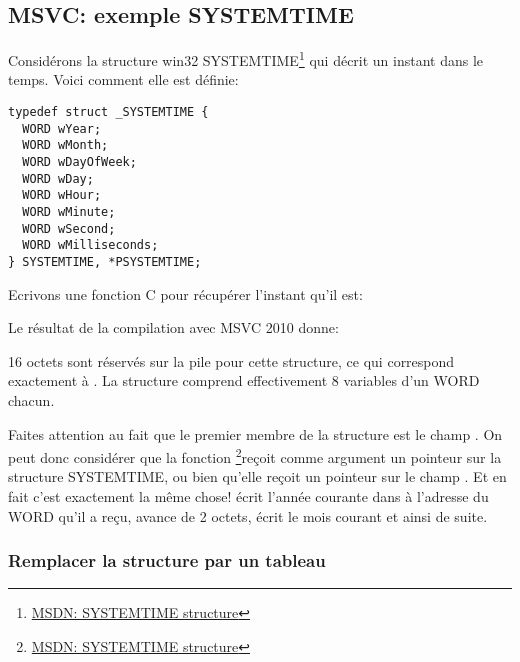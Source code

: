 ﻿\subsection{MSVC: exemple SYSTEMTIME}
\label{sec:SYSTEMTIME}

\newcommand{\FNSYSTEMTIME}{\footnote{\href{http://go.yurichev.com/17260}{MSDN: SYSTEMTIME structure}}}

Considérons la structure win32 SYSTEMTIME\FNSYSTEMTIME{} qui décrit un instant dans le temps. Voici 
comment elle est définie:

\begin{lstlisting}[caption=WinBase.h,style=customc]
typedef struct _SYSTEMTIME {
  WORD wYear;
  WORD wMonth;
  WORD wDayOfWeek;
  WORD wDay;
  WORD wHour;
  WORD wMinute;
  WORD wSecond;
  WORD wMilliseconds;
} SYSTEMTIME, *PSYSTEMTIME;
\end{lstlisting}

Ecrivons une fonction C pour récupérer l'instant qu'il est:



Le résultat de la compilation avec MSVC 2010 donne:



16 octets sont réservés sur la pile pour cette structure, ce qui correspond exactement à 
. La structure comprend effectivement 8 variables d'un WORD chacun.

\newcommand{\FNMSDNGST}{\footnote{\href{http://go.yurichev.com/17261}{MSDN: GetSystemTime function}}}

Faites attention au fait que le premier membre de la structure est le champ .
On peut donc considérer que la fonction \FNSYSTEMTIME reçoit comme argument 
un pointeur sur la structure SYSTEMTIME, ou bien qu'elle reçoit un pointeur sur le champ . 
Et en fait c'est exactement la même chose!
 écrit l'année courante dans à l'adresse du WORD qu'il a reçu, avance de 2 
octets, écrit le mois courant et ainsi de suite.



\subsubsection{Remplacer la structure par un tableau}


